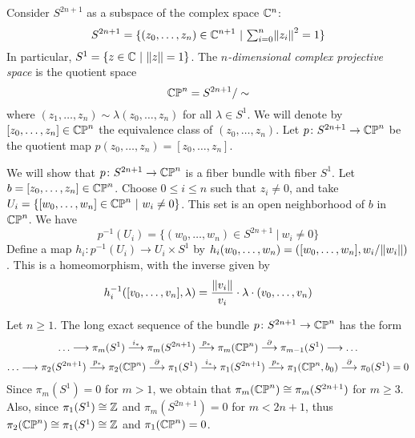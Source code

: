 \begin{example}
\label{CPN BUNDLE EXAMPLE}
Consider $S^{2n+1}$ as a subspace of the complex space ${\mathbb C}^{n}$:
\[
S^{2n+1} = \{(z_{0}, \dots, z_{n})\in \C^{n+1}\ | 
\ \textstyle{\sum_{i=0}^{n} \norm{z_{i}}^{2} = 1}\}
\]
In particular, $S^{1} = \{z \in \C \ | \ \norm{z} = 1\}$.
The \emph{$n$-dimensional complex projective space} is the quotient space 
\[
{\mathbb C\mathbb P}^{n} = S^{2n+1}/\sim
\]
where $(z_{1}, \dots, z_{n})\sim  \lambda(z_{0}, \dots , z_{n})$ for all 
$\lambda \in S^{1}$. We will denote by $[z_{0}, \dots, z_{n}]\in {\mathbb C\mathbb P}^{n}$
the equivalence class of $(z_{0}, \dots, z_{n})$. 
Let $p\colon S^{2n+1} \to {\mathbb C\mathbb P}^{n}$ be the quotient map
$p(z_{0}, \dots, z_{n}) = [z_{0}, \dots, z_{n}]$.

We will show that $p\colon S^{2n+1} \to {\mathbb C\mathbb P}^{n}$ is a fiber bundle with fiber 
$S^{1}$. Let $b = [z_{0}, \dots, z_{n}]\in {\mathbb C\mathbb P}^{n}$. Choose $0\leq i\leq n$ 
such that $z_{i}\neq 0$, 
and take $U_{i} = \{[w_{0}, \dots, w_{n}]\in {\mathbb C\mathbb P}^{n} \ |\  w_{i}\neq 0\}$. This 
set is an open neighborhood of $b$ in ${\mathbb C\mathbb P}^{n}$. We have  
\[
p^{-1}(U_{i}) = \{(w_{0}, \dots, w_{n})\in S^{2n+1} \ | \ w_{i}\neq 0\}
\]
Define a map $h_{i}\colon p^{-1}(U_{i}) \to U_{i}\times S^{1}$ by
$h_{i}(w_{0}, \dots, w_{n}) = ([w_{0}, \dots, w_{n}], w_{i}/\norm{w_{i}})$. 
This is a homeomorphism, with the inverse given by 
\[
h_{i}^{-1}([v_{0}, \dots, v_{n}], \lambda) = 
\frac{\norm{v_{i}}}{v_{i}}\cdot \lambda \cdot(v_{0}, \dots, v_{n})
\]

Let $n\geq 1$. The long exact sequence of the bundle $p\colon S^{2n+1} \to {\mathbb C\mathbb P}^{n}$
has the form 
\begin{multline*}
{\dots}\longrightarrow 
\pi_{m}(S^{1}) \overset{i_{\ast}}{\longrightarrow}
\pi_{m}(S^{2n+1}) \overset{p_{\ast}}{\longrightarrow}
\pi_{m}({\mathbb C\mathbb P}^{n}) \overset{\partial}{\longrightarrow} 
\pi_{m-1}(S^{1})\longrightarrow{\dots} \\
{\dots}\longrightarrow 
\pi_{2}(S^{2n+1}) \overset{p_{\ast}}{\longrightarrow}
\pi_{2}({\mathbb C\mathbb P}^{n}) \overset{\partial}{\longrightarrow}
\pi_{1}(S^{1}) \overset{i_{\ast}}{\longrightarrow}
\pi_{1}(S^{2n+1})\overset{p_{\ast}}{\longrightarrow} 
\pi_{1}({\mathbb C\mathbb P}^{n}, b_{0}) \overset{\partial}{\longrightarrow} 
\pi_{0}(S^{1}) = 0
\end{multline*}
Since $\pi_{m}(S^{1}) = 0$ for $m >1$, 
we obtain that  $\pi_{m}({\mathbb C\mathbb P}^{n})\cong \pi_{m}(S^{2n+1})$ for $m\geq 3$. 
Also, since $\pi_{1}(S^{1})\cong {\mathbb Z}$ and 
$\pi_{m}(S^{2n + 1}) = 0$ for $m<2n+1$, thus 
$\pi_{2}({\mathbb C\mathbb P}^{n}) \cong \pi_{1}(S^{1})\cong {\mathbb Z}$ and $\pi_{1}({\mathbb C\mathbb P}^{n}) = 0$. 
\end{example}

